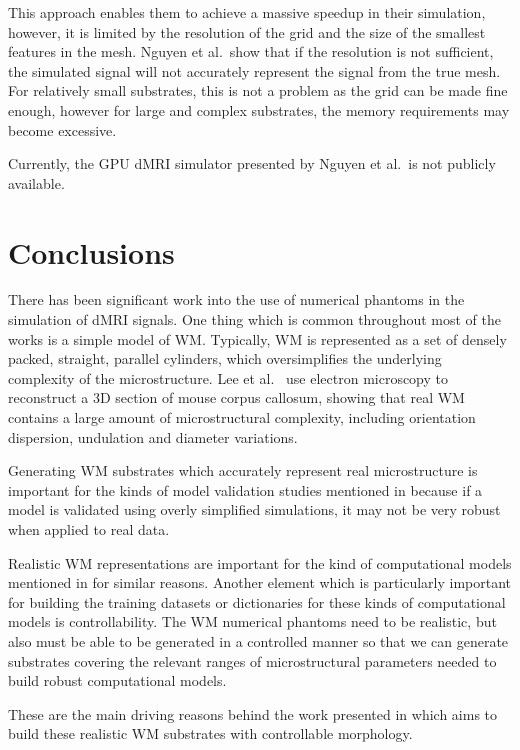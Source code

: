 This approach enables them to achieve a massive speedup in their simulation, however, it is limited by the resolution of the grid and the size of the smallest features in the mesh.
Nguyen et al.\ show that if the resolution is not sufficient, the simulated signal will not accurately represent the signal from the true mesh.
For relatively small substrates, this is not a problem as the grid can be made fine enough, however for large and complex substrates, the memory requirements may become excessive.

Currently, the \ac{GPU} \ac{dMRI} simulator presented by Nguyen et al.\ is not publicly available. 


\section{Conclusions}
\label{sec:review_conclusions}
There has been significant work into the use of numerical phantoms in the simulation of \acl{dMRI} signals.
One thing which is common throughout most of the works is a simple model of \ac{WM}.
Typically, \ac{WM} is represented as a set of densely packed, straight, parallel cylinders, which oversimplifies the underlying complexity of the microstructure.
Lee et al.\ \cite{Lee2018a} use electron microscopy to reconstruct a 3D section of mouse corpus callosum, showing that real \ac{WM} contains a large amount of microstructural complexity, including orientation dispersion, undulation and diameter variations.

Generating \ac{WM} substrates which accurately represent real microstructure is important for the kinds of model validation studies mentioned in  because if a model is validated using overly simplified simulations, it may not be very robust when applied to real data.

Realistic \ac{WM} representations are important for the kind of computational models mentioned in  for similar reasons.
Another element which is particularly important for building the training datasets or dictionaries for these kinds of computational models is controllability.
The \ac{WM} numerical phantoms need to be realistic, but also must be able to be generated in a controlled manner so that we can generate substrates covering the relevant ranges of microstructural parameters needed to build robust computational models.

These are the main driving reasons behind the work presented in  which aims to build these realistic \ac{WM} substrates with controllable morphology. 


